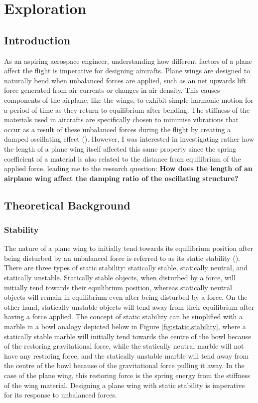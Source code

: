 \documentclass[12pt]{article}
\begin{document}
\section{Exploration}

\subsection{Introduction}

As an aspiring aerospace engineer, understanding how different factors of a plane affect the flight is imperative for designing aircrafts. Plane wings are designed to naturally bend when unbalanced forces are applied, such as an net upwards lift force generated from air currents or changes in air density. This causes components of the airplane, like the wings, to exhibit simple harmonic motion for a period of time as they return to equilibrium after bending. The stiffness of the materials used in aircrafts are specifically chosen to minimise vibrations that occur as a result of these unbalanced forces during the flight by creating a damped oscillating effect (\citeauthor{anderson_bowden_2022}). However, I was interested in investigating rather how the length of a plane wing itself affected this same property since the spring coefficient of a material is also related to the distance from equilibrium of the applied force, leading me to the research question: \textbf{How does the length of an airplane wing affect the damping ratio of the oscillating structure?}


\subsection{Theoretical Background}

\subsubsection{Stability}
The nature of a plane wing to initially tend towards its equilibrium position after being disturbed by an unbalanced force is referred to as its static stability (\citeauthor{anderson_bowden_2022}). There are three types of static stability: statically stable, statically neutral, and statically unstable. Statically stable objects, when disturbed by a force, will initially tend towards their equilibrium position, whereas statically neutral objects will remain in equilibrium even after being disturbed by a force. On the other hand, statically unstable objects will tend away from their equilibrium after having a force applied. The concept of static stability can be simplified with a marble in a bowl analogy depicted below in Figure \ref{fig:static.stability}, where a statically stable marble will initially tend towards the centre of the bowl because of the restoring gravitational force, while the statically neutral marble will not have any restoring force, and the statically unstable marble will tend away from the centre of the bowl because of the gravitational force pulling it away. In the case of the plane wing, this restoring force is the spring energy from the stiffness of the wing material. Designing a plane wing with static stability is imperative for its response to unbalanced forces. 
\end{document}
